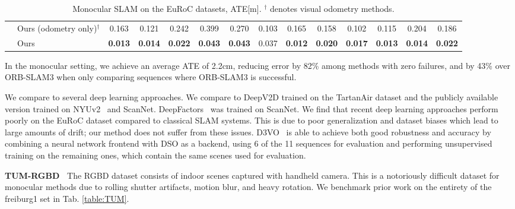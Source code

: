 \documentclass{article}
\begin{document}
\begin{table} [h]
{\begin{tabular}{cl| ccccc | ccc | ccc | c}
\midrule
& Ours (odometry only)$^\dagger$ & 0.163 & 0.121 & 0.242 & 0.399 & 0.270 & 0.103 & 0.165 & 0.158 & 0.102	& 0.115 & 0.204 & 0.186 \\
& Ours & \textbf{0.013} & \textbf{0.014} & \textbf{0.022} & \textbf{0.043} & \textbf{0.043} & 0.037 & \textbf{0.012} & \textbf{0.020} & \textbf{0.017} & \textbf{0.013} & \textbf{0.014} & \textbf{0.022} \\
\midrule
\end{tabular}
}
\caption{Monocular SLAM on the EuRoC datasets, ATE[m]. $^\dagger$ denotes visual odometry methods.}
\label{table:EurocMono}
\end{table}

In the monocular setting, we achieve an average ATE of 2.2cm, reducing error by 82\% among methods with zero failures, and by 43\% over ORB-SLAM3 when only comparing sequences where ORB-SLAM3 is successful.

We compare to several deep learning approaches. We compare to DeepV2D trained on the TartanAir dataset and the publicly available version trained on NYUv2~\cite{nyuv2} and ScanNet\cite{scannet}. DeepFactors~\cite{deepfactors} was trained on ScanNet. We find that recent deep learning approaches \cite{deepfactors,deepv2d,tartanvo} perform poorly on the EuRoC dataset compared to classical SLAM systems. This is due to poor generalization and dataset biases which lead to large amounts of drift; our method does not suffer from these issues. D3VO~\cite{d3vo} is able to achieve both good robustness and accuracy by combining a neural network frontend with DSO as a backend, using 6 of the 11 sequences for evaluation and performing unsupervised training on the remaining ones, which contain the same scenes used for evaluation.


\noindent \textbf{TUM-RGBD~\cite{tumrgbd} } The RGBD dataset consists of indoor scenes captured with handheld camera. This is a notoriously difficult dataset for monocular methods due to rolling shutter artifacts, motion blur, and heavy rotation. We benchmark prior work on the entirety of the freiburg1 set in Tab. \ref{table:TUM}.
\end{document}
